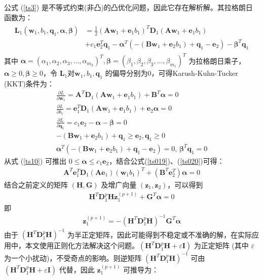 公式 (\ref{ts3}) 是不等式约束(非凸)的凸优化问题，因此它存在解析解。其拉格朗日函数为：
\begin{align}
\begin{split}
	\pmb{L}_1(\mathbf{w}_1,b_1,\mathbf{q}_1,\pmb{\alpha},\pmb{\beta}) &=\frac{1}{2}(\mathbf{Aw}_1+\mathbf{e}_1b_1)^T\mathbf{D}_1(\mathbf{Aw}_1+\mathbf{e}_1b_1)\\
	&+c_1\mathbf{e}_2^T\mathbf{q}_1-\pmb{\alpha}^T(-(\mathbf{Bw}_1+\mathbf{e}_2b_1)+\mathbf{q}_1-\mathbf{e}_2)-\pmb{\beta}^T\mathbf{q}_1
\end{split}
\end{align}
其中 $\pmb{\alpha}=(\alpha_1,\alpha_2,\alpha_3,\ldots,\alpha_{m_2})^T, \pmb{\beta}=(\beta_1,\beta_2,\beta_3,\ldots,\beta_{m_1})^T$ 为拉格朗日乘子，$\pmb{\alpha}\geq 0,\pmb{\beta}\geq 0$，令 $\pmb{L}_1$对$\mathbf{w}_1,b_1,\mathbf{q}_1$ 的偏导分别为0，可得Karush-Kuhn-Tucker (KKT)条件为：
\begin{gather}
    \label{ts019}
	\frac{\partial{L}}{\partial{\mathbf{w}_1}}=\mathbf{A}^T\mathbf{D}_1(\mathbf{Aw}_1+\mathbf{e}_1b_1)+\mathbf{B}^T\pmb{\alpha}=0\\
    \label{ts020}
	\frac{\partial{L}}{\partial{b_1}}=\mathbf{e}_1^T\mathbf{D}_1(\mathbf{Aw}_1+\mathbf{e}_1b_1)+\mathbf{e}_2\pmb{\alpha}=0\\
	\label{ts10}
	\frac{\partial{L}}{\partial{\mathbf{q}_1}}=c_1\mathbf{e}_2-\pmb{\alpha}-\pmb{\beta}=0\\
	-(\mathbf{Bw}_1+\mathbf{e}_2b_1)+\mathbf{q}_1 \geq \mathbf{e}_2, \mathbf{q}_1\geq 0\\
	\pmb{\alpha}^T(-(\mathbf{Bw}_1+\mathbf{e}_2b_1)+\mathbf{q}_1-\mathbf{e}_2)=0,\,\pmb{\beta}^T\mathbf{q}_1=0
\end{gather}
从式 (\ref{ts10}) 可推出 $0\le \pmb{\alpha} \le c_1\mathbf{e}_2$，结合公式(\ref{ts019})、(\ref{ts020})可得：
\begin{align}
	\mathbf{A}^T\mathbf{e}_1^T\mathbf{D}_1(\mathbf{Ae}_1)(\mathbf{w}_1b_1)^T+(\mathbf{B}^T\mathbf{e}_2^T)\pmb{\alpha}=0
\end{align}
结合之前定义的矩阵 $(\mathbf{H,G})$ 及增广向量 $(\mathbf{z}_1,\mathbf{z}_2)$，可以得到
\begin{align}
	\mathbf{H}^T\mathbf{D}_1^p\mathbf{Hz}_1^{(p+1)}+\mathbf{G}^T\pmb{\alpha}=0
\end{align}
即
\begin{align}
\label{ts11}
	\mathbf{z}_1^{(p+1)}=-(\mathbf{H}^T\mathbf{D}_1^p\mathbf{H})^{-1}\mathbf{G}^T\pmb{\alpha}
\end{align}
由于 $(\mathbf{H}^T\mathbf{D}_1^p\mathbf{H})^{-1}$ 为半正定矩阵，因此可能得到不稳定或不准确的解，在实际应用中，本文使用正则化方法解决这个问题。$(\mathbf{H}^T\mathbf{D}_1^p\mathbf{H}+\varepsilon \mathbf{I})$ 为正定矩阵 (其中 $\varepsilon$ 为一个小扰动)，不受奇点的影响。则逆矩阵 $(\mathbf{H}^T\mathbf{D}_1^p\mathbf{H})^{-1}$ 可由 $(\mathbf{H}^T\mathbf{D}_1^p\mathbf{H}+\varepsilon \mathbf{I})$ 代替，因此 $\mathbf{z}_1^{(p+1)}$ 可推导为：
